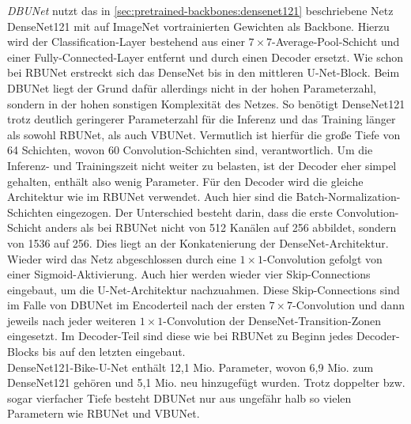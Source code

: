 \textit{\ac{DBUNet}} nutzt das in \autoref{sec:pretrained-backbones:densenet121} beschriebene Netz DenseNet121 
mit auf ImageNet vortrainierten Gewichten als Backbone.
Hierzu wird der Classification-Layer bestehend aus einer $7\times 7$-Average-Pool-Schicht 
und einer Fully-Connected-Layer entfernt und durch einen Decoder ersetzt. 
Wie schon bei \ac{RBUNet} erstreckt sich das DenseNet bis in den mittleren U-Net-Block. Beim \ac{DBUNet} 
liegt der Grund dafür allerdings nicht in der hohen Parameterzahl, sondern in der hohen sonstigen Komplexität 
des Netzes. So benötigt DenseNet121 trotz deutlich geringerer Parameterzahl für die Inferenz und das Training länger 
als sowohl \ac{RBUNet}, als auch \ac{VBUNet}. Vermutlich ist hierfür die große Tiefe von 64 Schichten, wovon 
60 Convolution-Schichten sind, verantwortlich. Um die Inferenz- und Trainingszeit nicht weiter zu belasten, 
ist der Decoder eher simpel gehalten, enthält also wenig Parameter. Für den Decoder wird die gleiche Architektur wie im \ac{RBUNet} verwendet.
Auch hier sind die Batch-Normalization-Schichten eingezogen. Der Unterschied besteht darin, 
dass die erste Convolution-Schicht anders als bei \ac{RBUNet} nicht von 512 Kanälen auf 256 abbildet, 
sondern von 1536 auf 256. Dies liegt an der Konkatenierung der DenseNet-Architektur. Wieder wird das 
Netz abgeschlossen durch eine $1\times 1$-Convolution gefolgt von einer Sigmoid-Aktivierung. 
Auch hier werden wieder vier Skip-Connections eingebaut, um die U-Net-Architektur nachzuahmen. 
Diese Skip-Connections sind im Falle von \ac{DBUNet} im Encoderteil nach der ersten $7 \times 7$-Convolution 
und dann jeweils nach jeder weiteren $1\times 1$-Convolution der DenseNet-Transition-Zonen eingesetzt. 
Im Decoder-Teil sind diese wie bei \ac{RBUNet} zu Beginn jedes Decoder-Blocks bis auf den letzten eingebaut. \\
DenseNet121-Bike-U-Net enthält 12,1 Mio. Parameter, wovon 6,9 Mio. zum DenseNet121 gehören und 5,1 Mio. neu hinzugefügt 
wurden. Trotz doppelter bzw. sogar vierfacher Tiefe besteht \ac{DBUNet} nur aus ungefähr halb so vielen 
Parametern wie \ac{RBUNet} und \ac{VBUNet}. 




